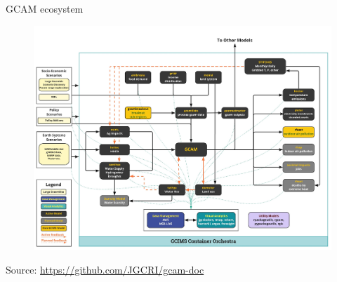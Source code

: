 \begin{frame}{GCAM ecosystem}
    \begin{figure}
        \centering
        \includegraphics[width = 0.8\linewidth]{extraFigs/GCAM_diagram.jpg}
    \end{figure}
    \vfill\hfill \tiny{Source: \url{https://github.com/JGCRI/gcam-doc}}
\end{frame}
    
